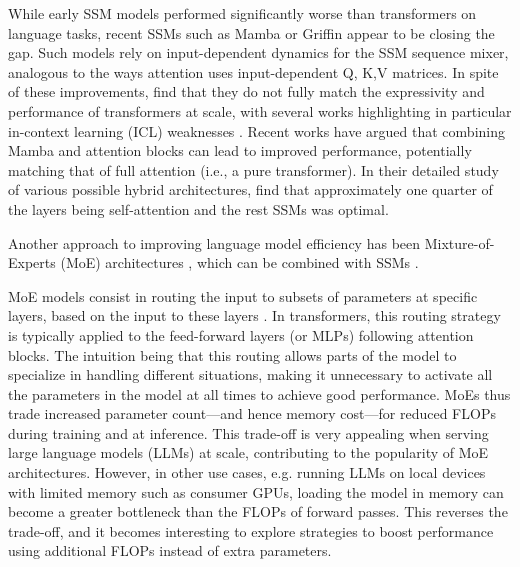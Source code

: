 While early SSM models performed significantly worse than transformers on language tasks, recent SSMs such as Mamba \citep{gu2023mamba} or Griffin \citep{de2024griffin} appear to be closing the gap. Such models rely on input-dependent dynamics for the SSM sequence mixer, analogous to the ways attention uses input-dependent Q, K,V matrices. In spite of these improvements, \citet{jelassi2024repeat} find that they do not fully match the expressivity and performance of transformers at scale, with several works highlighting in particular in-context learning (ICL) weaknesses \citep{park2024mamba,grazzi2024mamba}. Recent works have argued that combining Mamba and attention blocks can lead to improved performance, potentially matching that of full attention (i.e., a pure transformer). In their detailed study of various possible hybrid architectures, \citet{poli2024mechanistic} find that approximately one quarter of the layers being self-attention and the rest SSMs was optimal. 

Another approach to improving language model efficiency has been Mixture-of-Experts (MoE) architectures \citep{shazeer2016outrageously,fedus2022switch,rajbhandari2022deepspeed}, which can be combined with SSMs \citep{anthony2024blackmamba,lieber2024jamba}. 

MoE models consist in routing the input to subsets of parameters at specific layers, based on the input to these layers \citep{jacobs1991adaptive}. In transformers, this routing strategy is typically applied to the feed-forward layers (or MLPs) following attention blocks. The intuition being that this routing allows parts of the model to specialize in handling different situations, making it unnecessary to activate all the parameters in the model at all times to achieve good performance. MoEs thus trade increased parameter count---and hence memory cost---for reduced FLOPs during training and at inference. This trade-off is very appealing when serving large language models (LLMs) at scale, contributing to the popularity of MoE architectures. However, in other use cases, e.g. running LLMs on local devices with limited memory such as consumer GPUs, loading the model in memory can become a greater bottleneck than the FLOPs of forward passes. This reverses the trade-off, and it becomes interesting to explore strategies to boost performance using additional FLOPs instead of extra parameters. 

